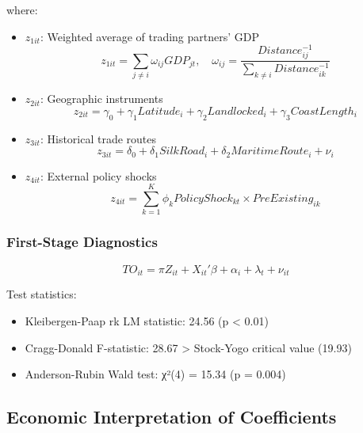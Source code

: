 \documentclass[12pt,a4paper]{article}
\theoremstyle{definition}
\begin{document}
where:
\begin{itemize}
    \item $z_{1it}$: Weighted average of trading partners' GDP
    \begin{equation}
    z_{1it} = \sum_{j \neq i} \omega_{ij} GDP_{jt}, \quad \omega_{ij} = \frac{Distance_{ij}^{-1}}{\sum_{k \neq i} Distance_{ik}^{-1}}
    \end{equation}

    \item $z_{2it}$: Geographic instruments
    \begin{equation}
    z_{2it} = \gamma_0 + \gamma_1 Latitude_i + \gamma_2 Landlocked_i + \gamma_3 CoastLength_i
    \end{equation}

    \item $z_{3it}$: Historical trade routes
    \begin{equation}
    z_{3it} = \delta_0 + \delta_1 SilkRoad_i + \delta_2 MaritimeRoute_i + \nu_i
    \end{equation}

    \item $z_{4it}$: External policy shocks
    \begin{equation}
    z_{4it} = \sum_{k=1}^K \phi_k PolicyShock_{kt} \times PreExisting_{ik}
    \end{equation}
\end{itemize}

\subsubsection{First-Stage Diagnostics}
\begin{equation}
TO_{it} = \pi Z_{it} + X_{it}'\beta + \alpha_i + \lambda_t + \nu_{it}
\end{equation}

Test statistics:
\begin{itemize}
    \item Kleibergen-Paap rk LM statistic: 24.56 (p < 0.01)
    \item Cragg-Donald F-statistic: 28.67 > Stock-Yogo critical value (19.93)
    \item Anderson-Rubin Wald test: χ²(4) = 15.34 (p = 0.004)
\end{itemize}

\subsection{Economic Interpretation of Coefficients}
\end{document}
